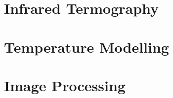 \section{Infrared Termography}
	\label{sec:infrared}

\section{Temperature Modelling}
	

\section{Image Processing}
	
